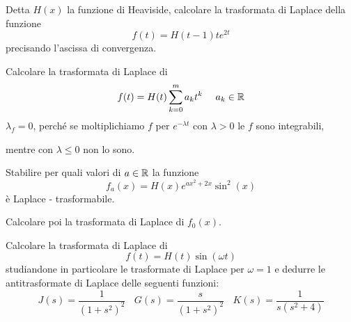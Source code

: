 Detta $\displaystyle H(x)$ la funzione di Heaviside, calcolare la trasformata di Laplace della funzione
\begin{equation*}
f(t) = H(t - 1) te^{2t}
\end{equation*}
precisando l'ascissa di convergenza.
\Esercizio{}

Calcolare la trasformata di Laplace di
\begin{equation*}
f(t) = H(t)\sum ^{m}_{k = 0} a_{k} t^{k} \ \ \ \ a_{k} \in \RR 
\end{equation*}
$\displaystyle \lambda _{f} = 0$, perché se moltiplichiamo $\displaystyle f$ per $\displaystyle e^{ - \lambda t}$ con $\displaystyle \lambda  > 0$ le $\displaystyle f$ sono integrabili, 

mentre con $\displaystyle \lambda \leq 0$ non lo sono.
\Esercizio{}

Stabilire per quali valori di $\displaystyle a\in \mathbb{R} $ la funzione
\begin{equation*}
f_{a}(x) = H(x) e^{ax^{2} + 2x}\sin^{2}(x)
\end{equation*}
è Laplace - trasformabile.

Calcolare poi la trasformata di Laplace di $\displaystyle f_{0}(x)$.
\Esercizio{}

Calcolare la trasformata di Laplace di
\begin{equation*}
f(t) = H(t)\sin(\omega t)
\end{equation*}
studiandone in particolare le trasformate di Laplace per $\displaystyle \omega = 1$ e dedurre le antitrasformate di Laplace delle seguenti funzioni:
\begin{equation*}
J(s) = \frac{1}{\left(1 + s^{2}\right)^{2}} \ \ \ \ G(s) = \frac{s}{\left(1 + s^{2}\right)^{2}} \ \ \ \ K(s) = \frac{1}{s\left(s^{2} + 4\right)}
\end{equation*}
\ParteSoluzioni
\Soluzione

